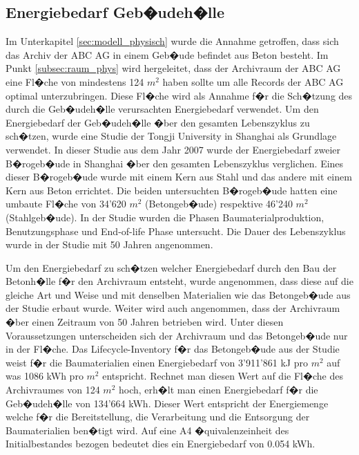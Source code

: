 \documentclass[a4paper,twoside,10pt]{report}
\begin{document}
\subsection{Energiebedarf Geb�udeh�lle}\label{h�lle}
Im Unterkapitel \ref{sec:modell_physisch} wurde die Annahme getroffen, dass sich das Archiv der ABC AG in einem Geb�ude befindet aus Beton besteht. Im Punkt \ref{subsec:raum_phys} wird hergeleitet, dass der Archivraum der ABC AG eine Fl�che von mindestens 124 $m^2$ haben sollte um alle Records der ABC AG optimal unterzubringen. Diese Fl�che wird als Annahme f�r die Sch�tzung des durch die Geb�udeh�lle verursachten Energiebedarf verwendet. Um den Energiebedarf der Geb�udeh�lle �ber den gesamten Lebenszyklus zu sch�tzen, wurde eine Studie der Tongji University in Shanghai als Grundlage verwendet. In dieser Studie aus dem Jahr 2007 wurde der Energiebedarf zweier B�rogeb�ude in Shanghai �ber den gesamten Lebenszyklus verglichen. Eines dieser B�rogeb�ude wurde mit einem Kern aus Stahl und das andere mit einem Kern aus Beton errichtet. Die beiden untersuchten B�rogeb�ude hatten eine umbaute Fl�che von 34'620 $m^2$ (Betongeb�ude) respektive 46'240 $m^2$ (Stahlgeb�ude). In der Studie wurden die Phasen Baumaterialproduktion, Benutzungsphase und End-of-life Phase untersucht. Die Dauer des Lebenszyklus wurde in der Studie mit 50 Jahren angenommen. \cite{lca_build}

Um den Energiebedarf zu sch�tzen welcher Energiebedarf durch den Bau der Betonh�lle f�r den Archivraum entsteht, wurde angenommen, dass diese auf die gleiche Art und Weise und mit denselben Materialien wie das Betongeb�ude aus der Studie erbaut wurde. Weiter wird auch angenommen, dass der Archivraum �ber einen Zeitraum von 50 Jahren betrieben wird. Unter diesen Voraussetzungen unterscheiden sich der Archivraum und das Betongeb�ude nur in der Fl�che. 
Das Lifecycle-Inventory f�r das Betongeb�ude aus der Studie weist f�r die Baumaterialien einen Energiebedarf von 3'911'861 kJ pro $m^2$ auf was 1086 kWh pro $m^2$ entspricht. Rechnet man diesen Wert auf die Fl�che des Archivraumes von 124 $m^2$ hoch, erh�lt man einen Energiebedarf f�r die Geb�udeh�lle von 134'664 kWh. Dieser Wert entspricht der Energiemenge welche f�r die Bereitstellung, die Verarbeitung und die Entsorgung der Baumaterialien ben�tigt wird. Auf eine A4 �quivalenzeinheit des Initialbestandes bezogen bedeutet dies ein Energiebedarf von 0.054 kWh.
\end{document}
